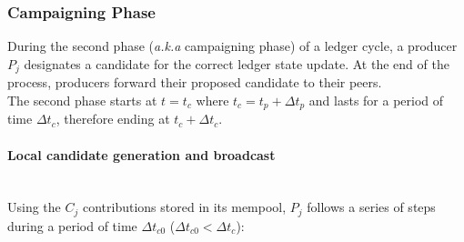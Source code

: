 
\subsubsection{Campaigning Phase}

During the second phase (\textit{a.k.a} campaigning phase) of a ledger cycle, a producer $P_j$ designates a candidate for the correct ledger state update. At the end of the process, producers forward their proposed candidate to their peers. \\

The second phase starts at $t = t_c$ where $t_c = t_p + \Delta t_{p}$ and lasts for a period of time $\Delta t_{c}$, therefore ending at $t_c+\Delta t_{c}$.

\paragraph{Local candidate generation and broadcast}\mbox{}\\
\label{subs:lv}
Using the $C_j$ contributions stored in its mempool, $P_j$ follows a series of steps during a period of time $\Delta t_{c0}$ ($\Delta t_{c0} < \Delta t_{c}$):
